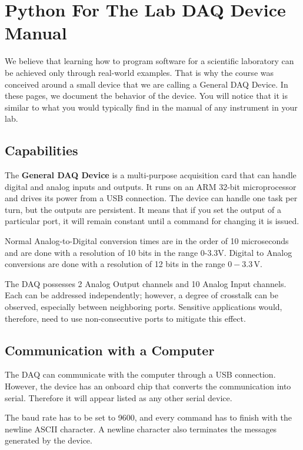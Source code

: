 \chapter[DAQ Device Manual]{Python For The Lab {DAQ} Device Manual}\label{ch:pftl-daq-manual}
We believe that learning how to program software for a scientific laboratory can be achieved only through real-world examples. That is why the course was conceived around a small device that we are calling a General {DAQ} Device. In these pages, we document the behavior of the device. You will notice that it is similar to what you would typically find in the manual of any instrument in your lab.

\section{Capabilities}\label{sec:capabilities}
The \textbf{General {DAQ} Device} is a multi-purpose acquisition card that can handle digital and analog inputs and outputs. It runs on an {ARM} 32-bit microprocessor and drives its power from a {USB} connection. The device can handle one task per turn, but the outputs are persistent. It means that if you set the output of a particular port, it will remain constant until a command for changing it is issued.

Normal Analog-to-Digital conversion times are in the order of 10 microseconds and are done with a resolution of 10 bits in the range 0-3.3V. Digital to Analog conversions are done with a resolution of 12 bits in the range $0-3.3\,\textrm{V}$.

The {DAQ} possesses 2 Analog Output channels and 10 Analog Input channels. Each can be addressed independently; however, a degree of crosstalk can be observed, especially between neighboring ports. Sensitive applications would, therefore, need to use non-consecutive ports to mitigate this effect.

\section{Communication with a Computer}\label{sec:communication-with-acomputer}
The {DAQ} can communicate with the computer through a {USB} connection. However, the device has an onboard chip that converts the communication into serial. Therefore it will appear listed as any other serial device.

The baud rate has to be set to 9600, and every command has to finish with the newline {ASCII} character. A newline character also terminates the messages generated by the device.


